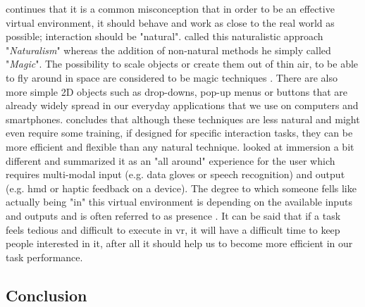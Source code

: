 \cite{Bowman2002} continues that it is a common misconception that in order to be an effective virtual environment, it should behave and work as close to the real world as possible; interaction should be "natural". \cite{Smith1987} called this naturalistic approach "\textit{Naturalism}" whereas the addition of non-natural methods he simply called "\textit{Magic}". The possibility to scale objects or create them out of thin air, to be able to fly around in space are considered to be magic techniques \citep{Bowman2002}. There are also more simple 2D objects such as drop-downs, pop-up menus or buttons that are already widely spread in our everyday applications that we use on computers and smartphones. \cite{Bowman2002} concludes that although these techniques are less natural and might even require some training, if designed for specific interaction tasks, they can be more efficient and flexible than any natural technique.\newline
\cite{Rosson2002} looked at immersion a bit different and summarized it as an "all around" experience for the user which requires multi-modal input (e.g. data gloves or speech recognition) and output (e.g. \gls{hmd} or haptic feedback on a device). The degree to which someone fells like actually being "in" this virtual environment is depending on the available inputs and outputs and is often referred to as presence \citep{Rosson2002}.\newline
It can be said that if a task feels tedious and difficult to execute in \gls{vr}, it will have a difficult time to keep people interested in it, after all it should help us to become more efficient in our task performance.



\subsection{Conclusion}

